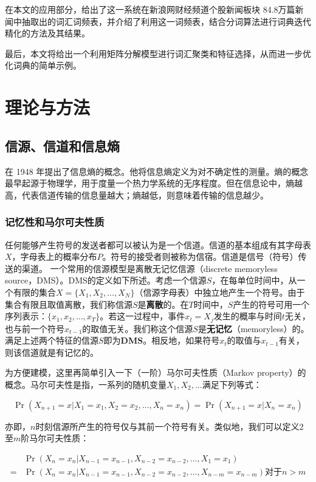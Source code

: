 \documentclass[UTF8]{ctexart}
\begin{document}
在本文的应用部分，给出了这一系统在新浪网财经频道个股新闻板块 84.8万篇新闻中抽取出的词汇词频表，并介绍了利用这一词频表，结合分词算法进行词典迭代精化的方法及其结果。

最后，本文将给出一个利用矩阵分解模型进行词汇聚类和特征选择，从而进一步优化词典的简单示例。

\section{理论与方法}
\subsection{信源、信道和信息熵}
\cite{Shannon1948} 在 1948 年提出了信息熵的概念。他将信息熵定义为对不确定性的测量。熵的概念最早起源于物理学，用于度量一个热力学系统的无序程度。但在信息论中，熵越高，代表信道传输的信息量越大；熵越低，则意味着传输的信息越少。

\subsubsection{记忆性和马尔可夫性质}
任何能够产生符号的发送者都可以被认为是一个信道。信道的基本组成有其字母表$X$，字母表上的概率分布$P$。符号的接受者则被称为信宿。信道是信号（符号）传送的渠道\cite{RMEInformation}。 一个常用的信源模型是离散无记忆信源（discrete memoryless source，DMS）。DMS的定义如下所述。考虑一个信源$S$，在每单位时间中，从一个有限的集合$X = \{ X_1, X_2, \dots, X_N \}$（信源字母表）中独立地产生一个符号。由于集合有限且取值离散，我们称信源$S$是\textbf{离散}的。在$T$时间中，$S$产生的符号可用一个序列表示：$\{ x_1, x_2, \dots, x_T \}$。若这一过程中，事件$x_t = X_j$发生的概率与时间$t$无关，也与前一个符号$x_{t-1}$的取值无关。我们称这个信源$S$是\textbf{无记忆}（memoryless）的。满足上述两个特征的信源$S$即为\textbf{DMS}。相反地，如果符号$x_t$的取值与$x_{t-1}$有关，则该信道就是有记忆的。

为方便建模，这里再简单引入一下（一阶）马尔可夫性质（Markov property）的概念。马尔可夫性是指，一系列的随机变量$X_1, X_2, \dots $满足下列等式：

\begin{equation}
\Pr(X_{n+1}=x|X_1=x_1, X_2=x_2, \dots, X_n=x_n) = \Pr(X_{n+1} = x| X_n = x_n)
\end{equation}

亦即，$n$时刻信源所产生的符号仅与其前一个符号有关。类似地，我们可以定义2至$m$阶马尔可夫性质：

\begin{equation}
\begin{aligned}
&\Pr(X_n=x_n|X_{n-1}=x_{n-1}, X_{n-2}=x_{n-2}, \dots , X_1=x_1) \\
= &\Pr(X_n=x_n|X_{n-1}=x_{n-1}, X_{n-2}=x_{n-2}, \dots, X_{n-m}=x_{n-m})  \text{对于}n > m
\end{aligned}
\end{equation}
\end{document}
